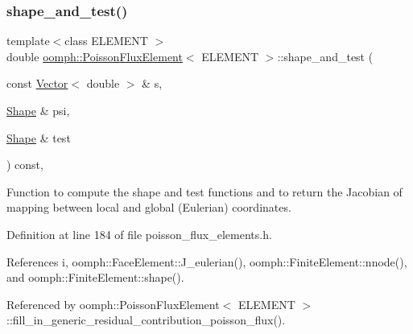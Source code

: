 \subsubsection{\texorpdfstring{shape\+\_\+and\+\_\+test()}{shape\_and\_test()}}
{\footnotesize\ttfamily template$<$class E\+L\+E\+M\+E\+NT $>$ \\
double \hyperlink{classoomph_1_1PoissonFluxElement}{oomph\+::\+Poisson\+Flux\+Element}$<$ E\+L\+E\+M\+E\+NT $>$\+::shape\+\_\+and\+\_\+test (\begin{DoxyParamCaption}\item[{const \hyperlink{classoomph_1_1Vector}{Vector}$<$ double $>$ \&}]{s,  }\item[{\hyperlink{classoomph_1_1Shape}{Shape} \&}]{psi,  }\item[{\hyperlink{classoomph_1_1Shape}{Shape} \&}]{test }\end{DoxyParamCaption}) const\hspace{0.3cm}{\ttfamily [inline]}, {\ttfamily [protected]}}



Function to compute the shape and test functions and to return the Jacobian of mapping between local and global (Eulerian) coordinates. 



Definition at line 184 of file poisson\+\_\+flux\+\_\+elements.\+h.



References i, oomph\+::\+Face\+Element\+::\+J\+\_\+eulerian(), oomph\+::\+Finite\+Element\+::nnode(), and oomph\+::\+Finite\+Element\+::shape().



Referenced by oomph\+::\+Poisson\+Flux\+Element$<$ E\+L\+E\+M\+E\+N\+T $>$\+::fill\+\_\+in\+\_\+generic\+\_\+residual\+\_\+contribution\+\_\+poisson\+\_\+flux().

\mbox{\label{classoomph_1_1PoissonFluxElement_a49ebbe60e94144a39bfa0169df410cfc}} 
